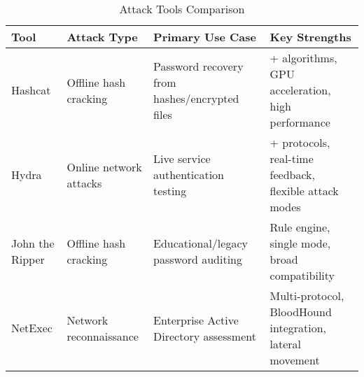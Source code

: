 \begin{table}[h!]
\centering
\begin{tabularx}{\textwidth}{|>{\raggedright\arraybackslash}X|>{\raggedright\arraybackslash}X|>{\raggedright\arraybackslash}X|>{\raggedright\arraybackslash}X|}
\hline
\textbf{Tool} & \textbf{Attack Type} & \textbf{Primary Use Case} & \textbf{Key Strengths} \\
\hline
Hashcat & Offline hash cracking & Password recovery from hashes/encrypted files & 450+ algorithms, GPU acceleration, high performance \\
\hline
Hydra & Online network attacks & Live service authentication testing & 50+ protocols, real-time feedback, flexible attack modes \\
\hline
John the Ripper & Offline hash cracking & Educational/legacy password auditing & Rule engine, single mode, broad compatibility \\
\hline
NetExec & Network reconnaissance & Enterprise Active Directory assessment & Multi-protocol, BloodHound integration, lateral movement \\
\hline
\end{tabularx}
\caption{Attack Tools Comparison}
\label{tab:envtools}
\end{table}

